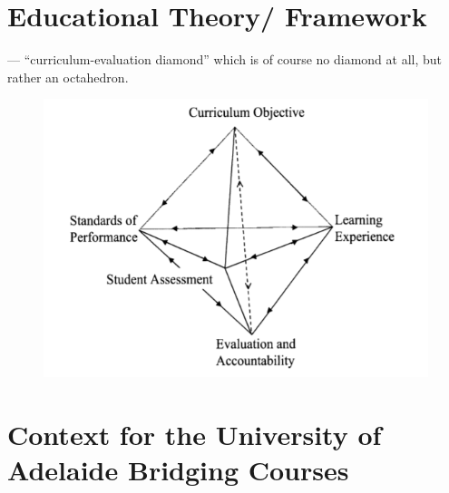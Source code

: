 \documentclass[twoside,12pt,a4paper]{report}
\begin{document}
\section{Educational Theory/ Framework}


\cite{Mohandas2003} --- ``curriculum-evaluation diamond'' which is of course no diamond at all, but rather an octahedron. 

\begin{figure}[ht]
\centering
\includegraphics{./figures/curriculum-assessment-model.PNG}
\end{figure}



\section{Context for the University of Adelaide Bridging Courses}
\end{document}
